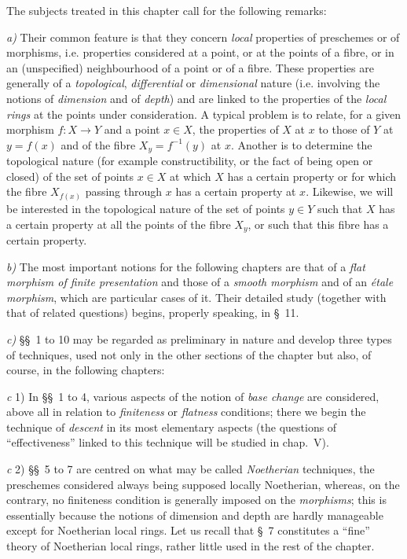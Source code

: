 \clearpage
{}

The subjects treated in this chapter call for the following remarks:

\medskip
\noindent
\emph{a)} Their common feature is that they concern \emph{local} properties
of preschemes or of morphisms, i.e. properties considered at a point, or at
the points of a fibre, or in an (unspecified) neighbourhood of a point or of
a fibre. These properties are generally of a \emph{topological},
\emph{differential} or \emph{dimensional} nature (i.e. involving the
notions of \emph{dimension} and of \emph{depth}) and are linked to the
properties of the \emph{local rings} at the points under consideration. A
typical problem is to relate, for a given morphism $f:X\to Y$ and a point
$x\in X$, the properties of $X$ at $x$ to those of $Y$ at $y=f(x)$ and of
the fibre $X_y=f^{-1}(y)$ at $x$. Another is to determine the topological
nature (for example constructibility, or the fact of being open or
closed) of the set of points $x\in X$ at which $X$ has a certain
property or for which the fibre $X_{f(x)}$ passing through $x$ has a
certain property at $x$. Likewise, we will be interested in the topological
nature of the set of points $y\in Y$ such that $X$ has a certain property at
all the points of the fibre $X_y$, or such that this fibre has a certain
property.

\medskip
\noindent
\emph{b)} The most important notions for the following chapters are
that of a \emph{flat morphism of finite presentation} and those of a
\emph{smooth morphism} and of an \emph{étale morphism}, which are particular
cases of it. Their detailed study (together with that of related questions)
begins, properly speaking, in §~11.

\medskip
\noindent
\emph{c)} §§~1 to 10 may be regarded as preliminary in nature
and develop three types of techniques, used not only in the
other sections of the chapter but also, of course, in the following
chapters:

\medskip
\noindent
\emph{c} 1) In §§~1 to 4, various aspects of the notion of
\emph{base change} are considered, above all in relation to
\emph{finiteness} or \emph{flatness} conditions; there we begin the
technique of \emph{descent} in its most elementary aspects (the questions
of ``effectiveness'' linked to this technique will be studied in chap.~V).

\medskip
\noindent
\emph{c} 2) §§~5 to 7 are centred on what may be called
\emph{Noetherian} techniques, the preschemes considered always being
supposed locally Noetherian, whereas, on the contrary, no finiteness
condition is generally imposed on the \emph{morphisms}; this is
essentially because the notions of dimension and depth are hardly
manageable except for Noetherian local rings. Let us recall that §~7
constitutes a ``fine'' theory of Noetherian local rings, rather little
used in the rest of the chapter.

